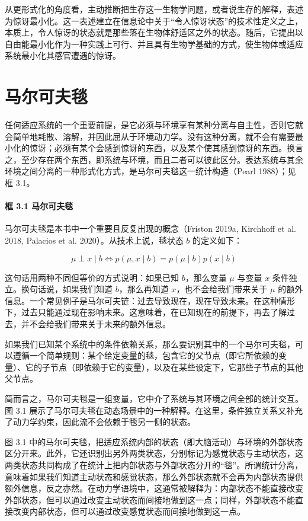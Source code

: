 从更形式化的角度看，主动推断把生存这一生物学问题，或者说生存的解释，表述为惊讶最小化。这一表述建立在信息论中关于“令人惊讶状态”的技术性定义之上，本质上，令人惊讶的状态就是那些落在生物体舒适区之外的状态。随后，它提出以自由能最小化作为一种实践上可行、并且具有生物学基础的方式，使生物体或适应系统最小化其感官遭遇的惊讶。

\section{马尔可夫毯}

任何适应系统的一个重要前提，是它必须与环境享有某种分离与自主性，否则它就会简单地耗散、溶解，并因此屈从于环境动力学。没有这种分离，就不会有需要最小化的惊讶；必须有某个会感到惊讶的东西，以及某个使其感到惊讶的东西。换言之，至少存在两个东西，即系统与环境，而且二者可以彼此区分。表达系统与其余环境之间分离的一种形式化方式，是马尔可夫毯这一统计构造（Pearl 1988）；见框 3.1。

\paragraph{框 3.1 马尔可夫毯}
马尔可夫毯是本书中一个重要且反复出现的概念（Friston 2019a, Kirchhoff et al. 2018, Palacios et al. 2020）。从技术上说，毯状态 $b$ 的定义如下：

\[
\mu \perp x \mid b \iff p(\mu, x \mid b) = p(\mu \mid b)p(x \mid b)
\]

这句话用两种不同但等价的方式说明：如果已知 $b$，那么变量 $\mu$ 与变量 $x$ 条件独立。换句话说，如果我们知道 $b$，那么再知道 $x$，也不会给我们带来关于 $\mu$ 的额外信息。一个常见例子是马尔可夫链：过去导致现在，现在导致未来。在这种情形下，过去只能通过现在影响未来。这意味着，在已知现在的前提下，再去了解过去，并不会给我们带来关于未来的额外信息。

如果我们已知某个系统中的条件依赖关系，那么要识别其中的一个马尔可夫毯，可以遵循一个简单规则：某个给定变量的毯，包含它的父节点（即它所依赖的变量）、它的子节点（即依赖于它的变量），以及在某些设定下，它那些子节点的其他父节点。

简而言之，马尔可夫毯是一组变量，它中介了系统与其环境之间全部的统计交互。图 3.1 展示了马尔可夫毯在动态场景中的一种解释。在这里，条件独立关系又补充了动力学约束，因此流不会依赖于毯另一侧的状态。

图 3.1 中的马尔可夫毯，把适应系统内部的状态（即大脑活动）与环境的外部状态区分开来。此外，它还识别出另外两类状态，分别标记为感觉状态与主动状态，这两类状态共同构成了在统计上把内部状态与外部状态分开的“毯”。所谓统计分离，意味着如果我们知道主动状态和感觉状态，那么外部状态就不会再为内部状态提供额外信息，反之亦然。在动力学语境中，这通常被解释为：内部状态不能直接改变外部状态，但可以通过改变主动状态而间接地做到这一点；同样，外部状态不能直接改变内部状态，但可以通过改变感觉状态而间接地做到这一点。


